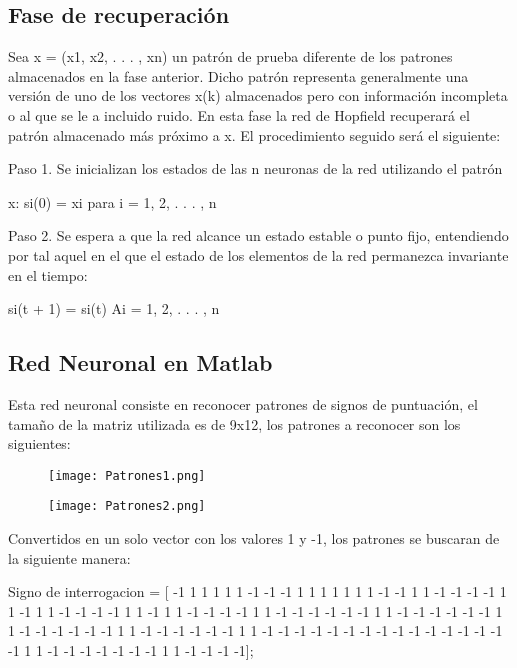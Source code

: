 \documentclass[12pt]{article}
\begin{document}
\subsection*{\large{Fase de recuperación}}
Sea x = (x1, x2, . . . , xn) un patrón de prueba diferente de los patrones almacenados en la fase anterior. Dicho patrón representa generalmente una versión de uno de los vectores x(k) almacenados pero con información incompleta o al que se le a incluido ruido. En esta fase la red de Hopfield recuperará el patrón almacenado más próximo a x. El procedimiento seguido será el siguiente: 

Paso 1. Se inicializan los estados de las n neuronas de la red utilizando el patrón 

\begin{center}
    x: si(0) = xi para i = 1, 2, . . . , n
\end{center}

Paso 2. Se espera a que la red alcance un estado estable o punto fijo, entendiendo por tal aquel en el que el estado de los elementos de la red permanezca invariante en el tiempo:

\begin{center}
    si(t + 1) = si(t) Ai = 1, 2, . . . , n
\end{center}

\pagebreak

\subsection*{\large{Red Neuronal en Matlab}}

Esta red neuronal consiste en reconocer patrones de signos de puntuación, el tamaño de la matriz utilizada es de 9x12, los patrones a reconocer son los siguientes:

\begin{figure}[h]
\centering
\texttt{[image: Patrones1.png]}
\end{figure}

\begin{figure}[h]
\centering
\texttt{[image: Patrones2.png]}
\end{figure}

Convertidos en un solo vector con los valores 1 y -1, los patrones se buscaran de la siguiente manera:

Signo de interrogacion = [ -1 1 1 1 1 1 -1 -1 -1 1 1 1 1 1 1 1 -1 -1 1 1 -1 -1 -1 -1 1 1 -1 1 1 -1 -1 -1 -1 1 1 -1 1 1 -1 -1 -1 -1 1 1 -1 -1 -1 -1 -1 -1 1 1 -1 -1 -1 -1 -1 -1 1 1 -1 -1 -1 -1 -1 -1 1 1 -1 -1 -1 -1 -1 -1 1 1 -1 -1 -1 -1 -1 -1 -1 -1 -1 -1 -1 -1 -1 -1 -1 -1 1 1 -1 -1 -1 -1 -1 -1 -1 1 1 -1 -1 -1 -1];
\end{document}
